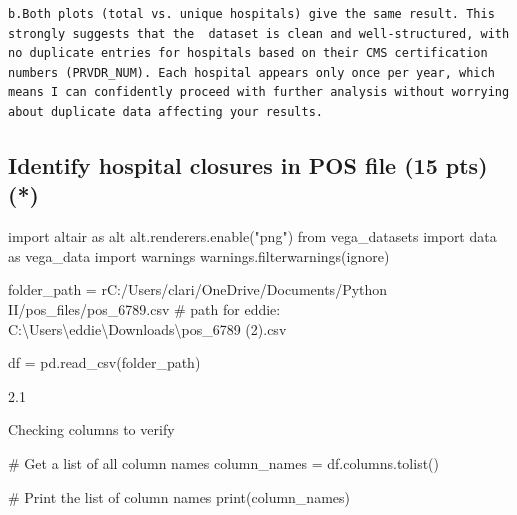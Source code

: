\documentclass[
  letterpaper,
  DIV=11,
  numbers=noendperiod]{scrartcl}
\newenvironment{Shaded}{\begin{snugshade}}{\end{snugshade}}
\newcommand{\BuiltInTok}[1]{\textcolor[rgb]{0.00,0.23,0.31}{#1}}
\newcommand{\CommentTok}[1]{\textcolor[rgb]{0.37,0.37,0.37}{#1}}
\newcommand{\ImportTok}[1]{\textcolor[rgb]{0.00,0.46,0.62}{#1}}
\newcommand{\NormalTok}[1]{\textcolor[rgb]{0.00,0.23,0.31}{#1}}
\newcommand{\OperatorTok}[1]{\textcolor[rgb]{0.37,0.37,0.37}{#1}}
\newcommand{\StringTok}[1]{\textcolor[rgb]{0.13,0.47,0.30}{#1}}
\newcommand{\VerbatimStringTok}[1]{\textcolor[rgb]{0.13,0.47,0.30}{#1}}
\begin{document}
\begin{verbatim}
b.Both plots (total vs. unique hospitals) give the same result. This strongly suggests that the  dataset is clean and well-structured, with no duplicate entries for hospitals based on their CMS certification numbers (PRVDR_NUM). Each hospital appears only once per year, which means I can confidently proceed with further analysis without worrying about duplicate data affecting your results.
\end{verbatim}

\subsection{Identify hospital closures in POS file (15 pts)
(*)}\label{identify-hospital-closures-in-pos-file-15-pts}

\begin{Shaded}
\begin{Highlighting}[]
\ImportTok{import}\NormalTok{ altair }\ImportTok{as}\NormalTok{ alt}
\NormalTok{alt.renderers.enable(}\StringTok{"png"}\NormalTok{)}
\ImportTok{from}\NormalTok{ vega\_datasets }\ImportTok{import}\NormalTok{ data }\ImportTok{as}\NormalTok{ vega\_data}
\ImportTok{import}\NormalTok{ warnings }
\NormalTok{warnings.filterwarnings(}\StringTok{\textquotesingle{}ignore\textquotesingle{}}\NormalTok{)}

\NormalTok{folder\_path }\OperatorTok{=} \VerbatimStringTok{r\textquotesingle{}C:/Users/clari/OneDrive/Documents/Python II/pos\_files/pos\_6789.csv\textquotesingle{}}
\CommentTok{\# path for eddie: \textquotesingle{}C:\textbackslash{}Users\textbackslash{}eddie\textbackslash{}Downloads\textbackslash{}pos\_6789 (2).csv\textquotesingle{}}

\NormalTok{df }\OperatorTok{=}\NormalTok{ pd.read\_csv(folder\_path)}
\end{Highlighting}
\end{Shaded}

2.1

Checking columns to verify

\begin{Shaded}
\begin{Highlighting}[]
\CommentTok{\# Get a list of all column names}
\NormalTok{column\_names }\OperatorTok{=}\NormalTok{ df.columns.tolist()}

\CommentTok{\# Print the list of column names}
\BuiltInTok{print}\NormalTok{(column\_names)}
\end{Highlighting}
\end{Shaded}
\end{document}
